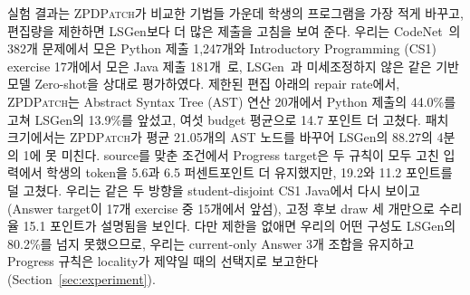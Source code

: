 \documentclass[10pt,conference]{IEEEtran}
\begin{document}
실험 결과는 \textsc{ZPDPatch}가 비교한 기법들 가운데 학생의 프로그램을 가장 적게 바꾸고, 편집량을 제한하면 LSGen보다 더 많은 제출을 고침을 보여 준다. 우리는 CodeNet~\cite{puri2021codenet}의 382개 문제에서 모은 Python 제출 1,247개와 Introductory Programming (CS1) exercise 17개에서 모은 Java 제출 181개~\cite{duan2024tiktoc}로, LSGen~\cite{dai2026learner}과 미세조정하지 않은 같은 기반 모델 Zero-shot을 상대로 평가하였다. 제한된 편집 아래의 repair rate에서, \textsc{ZPDPatch}는 Abstract Syntax Tree (AST) 연산 20개에서 Python 제출의 44.0\%를 고쳐 LSGen의 13.9\%를 앞섰고, 여섯 budget 평균으로 14.7 포인트 더 고쳤다. 패치 크기에서는 \textsc{ZPDPatch}가 평균 21.05개의 AST 노드를 바꾸어 LSGen의 88.27의 4분의 1에 못 미친다. source를 맞춘 조건에서 Progress target은 두 규칙이 모두 고친 입력에서 학생의 token을 5.6과 6.5 퍼센트포인트 더 유지했지만, 19.2와 11.2 포인트를 덜 고쳤다. 우리는 같은 두 방향을 student-disjoint CS1 Java에서 다시 보이고(Answer target이 17개 exercise 중 15개에서 앞섬), 고정 후보 draw 세 개만으로 수리율 15.1 포인트가 설명됨을 보인다. 다만 제한을 없애면 우리의 어떤 구성도 LSGen의 80.2\%를 넘지 못했으므로, 우리는 current-only Answer 3개 조합을 유지하고 Progress 규칙은 locality가 제약일 때의 선택지로 보고한다(Section~\ref{sec:experiment}).
\end{document}

